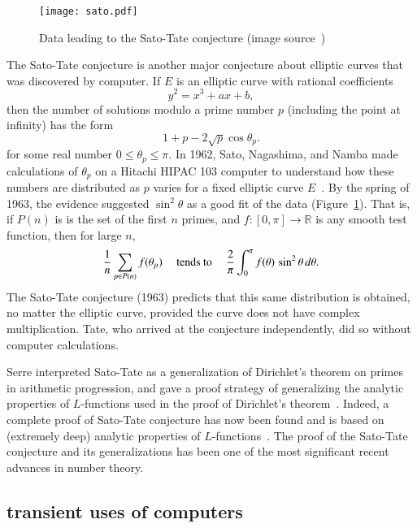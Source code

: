 \documentclass{llncs}
\newcommand{\ring}[1]{\mathbb{#1}}
\begin{document}

\begin{figure}[h!]
  \centering
\texttt{[image: sato.pdf]}
  \caption{Data leading to the Sato-Tate conjecture (image source~\cite{ST2})}
\label{fig:st}
\end{figure}



The Sato-Tate conjecture is another major conjecture about elliptic
curves that was discovered by computer.  If $E$ is an elliptic curve
with rational coefficients
\[
y^2 = x^3 + a x + b,
\]
then the number of solutions modulo a prime number $p$ (including the
point at infinity) has the form
\[
1 + p - 2\sqrt{p}\cos\theta_p.
\]
for some real number $0\le \theta_p\le \pi$.  In 1962, Sato,
Nagashima, and Namba made calculations  of $\theta_p$ on a Hitachi
HIPAC 103 computer to understand how these numbers are distributed as
$p$ varies for a fixed elliptic curve $E$~\cite{Sch}.  By the spring of 1963, the
evidence suggested  $\sin^2\theta$ as a good fit of the data (Figure~\ref{fig:st}).
That is, if $P(n)$ is is the set of the first $n$ primes, and
$f:[0,\pi]\to\ring{R}$ is any smooth test function, then for large
$n$,
\[
\frac{1}{n}\sum_{p\in P(n)} f(\theta_p) \quad\hbox{ tends to }\quad
\frac{2}{\pi}\int_0^\pi f(\theta)\,\sin^2\theta\,d\theta.
\]
The Sato-Tate conjecture (1963) predicts that this same distribution is
obtained, no matter the elliptic curve, provided the curve does not
have complex multiplication.  Tate, who arrived at the conjecture
independently, did so without computer calculations.

Serre interpreted Sato-Tate as a generalization of Dirichlet's theorem
on primes in arithmetic progression, and gave a proof strategy of
generalizing the analytic properties of $L$-functions used in the
proof of Dirichlet's theorem~\cite{Se68}.  Indeed, a complete proof of
Sato-Tate conjecture has now been found and is based on (extremely
deep) analytic properties of $L$-functions~\cite{Car:Bourbaki}.  The
proof of the Sato-Tate conjecture and its generalizations has been one
of the most significant recent advances in number theory.







\subsection{transient uses of computers}
\end{document}
